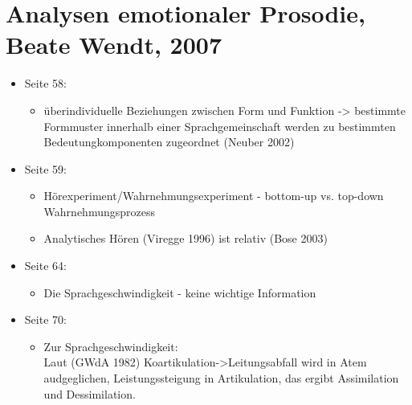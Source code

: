 \documentclass[11pt,a4paper,headsepline,twoside,toc=bibliography]{scrreprt}
\begin{document}
\section{Analysen emotionaler Prosodie, Beate Wendt, 2007}
\begin{itemize}
	
		
	\item Seite 58:
	\begin{itemize}
	
		
		\item überindividuelle Beziehungen zwischen Form und Funktion -> bestimmte Formmuster innerhalb einer Sprachgemeinschaft werden zu bestimmten Bedeutungkomponenten zugeordnet (Neuber 2002)	
	\end{itemize}

	\item Seite 59:
	\begin{itemize}	
		\item Hörexperiment/Wahrnehmungsexperiment - bottom-up vs. top-down Wahrnehmungsprozess 
		\item Analytisches Hören (Viregge 1996) ist relativ (Bose 2003)
	\end{itemize}

	\item Seite 64:
	\begin{itemize}
		\item Die Sprachgeschwindigkeit - keine wichtige Information
	\end{itemize}
	 
	
	\item Seite 70:
	\begin{itemize}
		\item Zur Sprachgeschwindigkeit:\\
		Laut (GWdA 1982) Koartikulation->Leitungsabfall wird in Atem audgeglichen, Leistungssteigung in Artikulation, das ergibt Assimilation und Dessimilation. 
	\end{itemize} 
\end{itemize}
\end{document}
